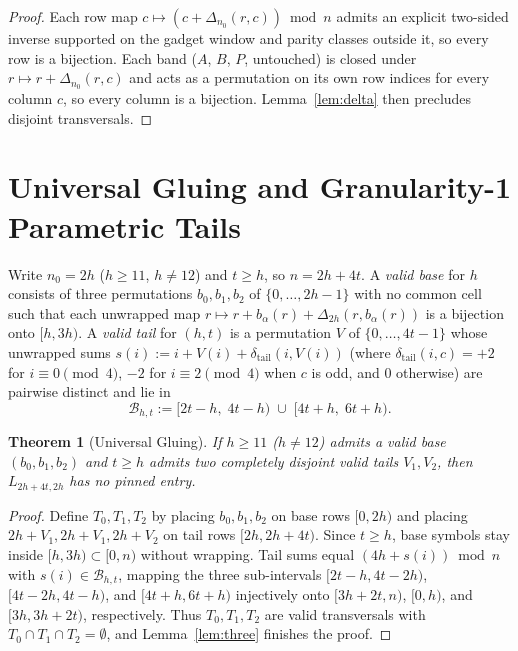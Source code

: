 \documentclass[11pt]{article}
\newtheorem{theorem}{Theorem}
\begin{document}
\begin{proof}
Each row map $c \mapsto (c + \Delta_{n_0}(r, c)) \bmod n$ admits an explicit two-sided inverse supported on the gadget window and parity classes outside it, so every row is a bijection. Each band ($A$, $B$, $P$, untouched) is closed under $r \mapsto r + \Delta_{n_0}(r, c)$ and acts as a permutation on its own row indices for every column $c$, so every column is a bijection. Lemma~\ref{lem:delta} then precludes disjoint transversals.
\end{proof}

\section{Universal Gluing and Granularity-1 Parametric Tails}

Write $n_0 = 2h$ ($h \ge 11$, $h \ne 12$) and $t \ge h$, so $n = 2h + 4t$. A \emph{valid base} for $h$ consists of three permutations $b_0, b_1, b_2$ of $\{0,\dots,2h-1\}$ with no common cell such that each unwrapped map $r \mapsto r + b_\alpha(r) + \Delta_{2h}(r, b_\alpha(r))$ is a bijection onto $[h, 3h)$. A \emph{valid tail} for $(h, t)$ is a permutation $V$ of $\{0,\dots,4t-1\}$ whose unwrapped sums $s(i) := i + V(i) + \delta_{\mathrm{tail}}(i, V(i))$ (where $\delta_{\mathrm{tail}}(i, c) = +2$ for $i \equiv 0 \pmod 4$, $-2$ for $i \equiv 2 \pmod 4$ when $c$ is odd, and $0$ otherwise) are pairwise distinct and lie in
\[
  \mathcal{B}_{h, t} := [2t - h,\; 4t - h) \;\cup\; [4t + h,\; 6t + h).
\]

\begin{theorem}[Universal Gluing]\label{thm:glue}
If $h \ge 11$ ($h \ne 12$) admits a valid base $(b_0, b_1, b_2)$ and $t \ge h$ admits two completely disjoint valid tails $V_1, V_2$, then $L_{2h + 4t, 2h}$ has no pinned entry.
\end{theorem}

\begin{proof}
Define $T_0, T_1, T_2$ by placing $b_0, b_1, b_2$ on base rows $[0, 2h)$ and placing $2h + V_1, 2h + V_1, 2h + V_2$ on tail rows $[2h, 2h + 4t)$. Since $t \ge h$, base symbols stay inside $[h, 3h) \subset [0, n)$ without wrapping. Tail sums equal $(4h + s(i)) \bmod n$ with $s(i) \in \mathcal{B}_{h, t}$, mapping the three sub-intervals $[2t - h, 4t - 2h)$, $[4t - 2h, 4t - h)$, and $[4t + h, 6t + h)$ injectively onto $[3h + 2t, n)$, $[0, h)$, and $[3h, 3h + 2t)$, respectively. Thus $T_0, T_1, T_2$ are valid transversals with $T_0 \cap T_1 \cap T_2 = \emptyset$, and Lemma~\ref{lem:three} finishes the proof.
\end{proof}
\end{document}
